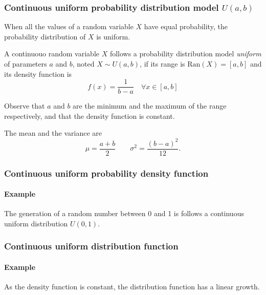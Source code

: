 \begin{frame}
\frametitle{Continuous uniform probability distribution model $U(a,b)$}
When all the values of a random variable $X$ have equal probability, the probability distribution of $X$ is uniform.

\begin{definition}
A continuouo random variable $X$ follows a probability distribution model \emph{uniform} of parameters $a$ and
$b$, noted $X\sim U(a,b)$, if its range is $\mbox{Ran}(X) = [a,b]$ and its density function is
\[
f(x)= \frac{1}{b-a}\quad \forall x\in [a,b]
\]
\end{definition}

Observe that $a$ and $b$ are the minimum and the maximum of the range respectively, and that the density function is
constant. 

The mean and the variance are
\[
\mu = \frac{a+b}{2}\qquad \sigma^2=\frac{(b-a)^2}{12}.
\]
\end{frame}


\begin{frame}
\frametitle{Continuous uniform probability density function}
\framesubtitle{Example}

The generation of a random number between 0 and 1 is follows a continuous uniform distribution $U(0,1)$.
\begin{center}
\end{center}
\end{frame}


\begin{frame}
\frametitle{Continuous uniform distribution function}
\framesubtitle{Example}
As the density function is constant, the distribution function has a linear growth. 
\begin{center}
\end{center}
\end{frame}


